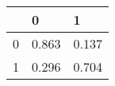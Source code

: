 \begin{tabular}{lll}
\toprule
 & 0 & 1 \\
\midrule
0 & 0.863 & 0.137 \\
1 & 0.296 & 0.704 \\
\bottomrule
\end{tabular}
